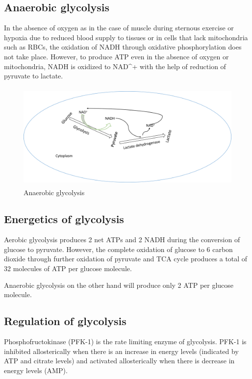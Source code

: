 \documentclass[
]{book}
\begin{document}
\subsection{Anaerobic glycolysis}\label{anaerobic-glycolysis}

In the absence of oxygen as in the case of muscle during sternous exercise or hypoxia due to reduced blood supply to tissues or in cells that lack mitochondria such as RBCs, the oxidation of NADH through oxidative phosphorylation does not take place. However, to produce ATP even in the absence of oxygen or mitochondria, NADH is oxidized to NAD\^{}+ with the help of reduction of pyruvate to lactate.

\begin{figure}
\centering
\includegraphics[width=\textwidth,height=2.08333in]{Images/AnaerobicGlycolysis.png}
\caption{Anaerobic glycolysis}
\end{figure}

\subsection{Energetics of glycolysis}\label{energetics-of-glycolysis}

Aerobic glycolysis produces 2 net ATPs and 2 NADH during the conversion of glucose to pyruvate. However, the complete oxidation of glucose to 6 carbon dioxide through further oxidation of pyruvate and TCA cycle produces a total of 32 molecules of ATP per glucose molecule.

Anaerobic glycolysis on the other hand will produce only 2 ATP per glucose molecule.

\subsection{Regulation of glycolysis}\label{regulation-of-glycolysis}

Phosphofructokinase (PFK-1) is the rate limiting enzyme of glycolysis. PFK-1 is inhibited allosterically when there is an increase in energy levels (indicated by ATP and citrate levels) and activated allosterically when there is decrease in energy levels (AMP).
\end{document}
